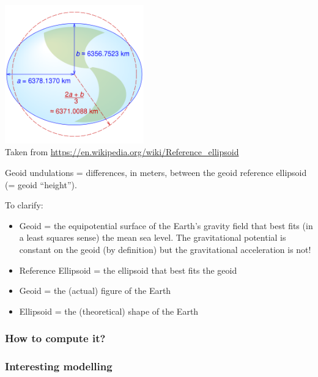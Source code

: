 \begin{center}
\includegraphics[width=6cm]{images/geoid/ellipsoid_wgs84}\\
Taken from \url{https://en.wikipedia.org/wiki/Reference_ellipsoid}
\end{center}


Geoid undulations = differences, in meters, between
the geoid reference ellipsoid
(= geoid “height”).

To clarify:
\begin{itemize}
\item Geoid = the equipotential surface of the Earth’s gravity field that
best fits (in a least squares sense) the mean sea level.
The gravitational potential is constant on the geoid (by definition) but 
the gravitational acceleration is not! 

\item Reference Ellipsoid = the ellipsoid that best fits the geoid 
\item Geoid = the (actual) figure of the Earth 
\item Ellipsoid = the (theoretical) shape of the Earth
\end{itemize}



\subsubsection{How to compute it?}

\subsubsection{Interesting modelling}

